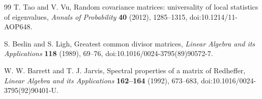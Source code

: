 \documentclass[11pt,a4paper]{article}
\begin{document}
\begin{thebibliography}{99}
T. Tao and V. Vu,
Random covariance matrices: universality of local statistics of eigenvalues,
\emph{Annals of Probability} \textbf{40} (2012), 1285--1315,
doi:10.1214/11-AOP648.

S. Beslin and S. Ligh,
Greatest common divisor matrices,
\emph{Linear Algebra and its Applications} \textbf{118} (1989), 69--76,
doi:10.1016/0024-3795(89)90572-7.

W. W. Barrett and T. J. Jarvis,
Spectral properties of a matrix of Redheffer,
\emph{Linear Algebra and its Applications} \textbf{162--164} (1992), 673--683,
doi:10.1016/0024-3795(92)90401-U.

\end{thebibliography}
\end{document}
